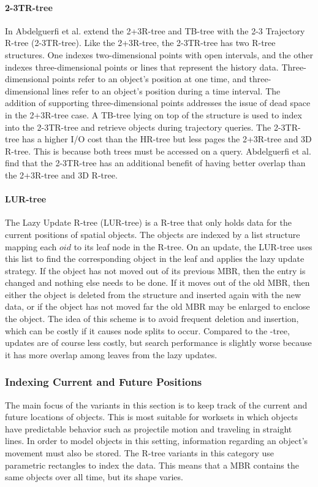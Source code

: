 \paragraph{2-3TR-tree} In \cite{abdelguerfi20022} Abdelguerfi et al. extend 
the 2+3R-tree and TB-tree with the 2-3 Trajectory R-tree (2-3TR-tree). 
Like the 2+3R-tree, the 2-3TR-tree has two R-tree structures. One indexes
two-dimensional points with open intervals, and the other indexes 
three-dimensional points or lines that represent the history data. 
Three-dimensional points refer to an object's position at one time, and 
three-dimensional lines refer to an object's position during a time 
interval. The addition of supporting three-dimensional points addresses 
the issue of dead space in the 2+3R-tree case. A TB-tree lying on top of 
the structure is used to index into the 2-3TR-tree and retrieve objects 
during trajectory queries. The 2-3TR-tree has a higher I/O cost than the 
HR-tree but less pages the 2+3R-tree and 3D R-tree. This is because both
trees must be accessed on a query. Abdelguerfi et al. find that the 
2-3TR-tree has an additional benefit of having better overlap than the 
2+3R-tree and 3D R-tree.

\paragraph{LUR-tree} The Lazy Update R-tree (LUR-tree) \cite{kwon2002indexing}
is a R-tree that only holds data for the current positions of spatial 
objects. The objects are indexed by a list structure mapping each $oid$ 
to its leaf node in the R-tree. On an update, the LUR-tree uses this list
to find the corresponding object in the leaf and applies the lazy 
update strategy. If the
object has not moved out of its previous MBR, then the entry is changed
and nothing else needs to be done. If it moves out of the old MBR, then 
either the object is deleted from the structure and inserted again with 
the new data, or if the object has not moved far the old MBR may be 
enlarged to enclose the object. The idea of this scheme is to avoid 
frequent deletion and insertion, which can be costly if it causes node
splits to occur. Compared to the \rstar-tree, updates are of course less
costly, but search performance is slightly worse because it has more 
overlap among leaves from the lazy updates.

\subsubsection{Indexing Current and Future Positions}
The main focus of the variants in this section is to keep track of the current
and future locations of objects. This is most suitable for worksets in which 
objects have predictable behavior such as projectile motion and traveling in
straight lines. In order to model objects in this setting, information regarding
an object's movement must also be stored. The R-tree variants in this category 
use parametric rectangles to index the data. This means that a MBR contains
the same objects over all time, but its shape varies. 

